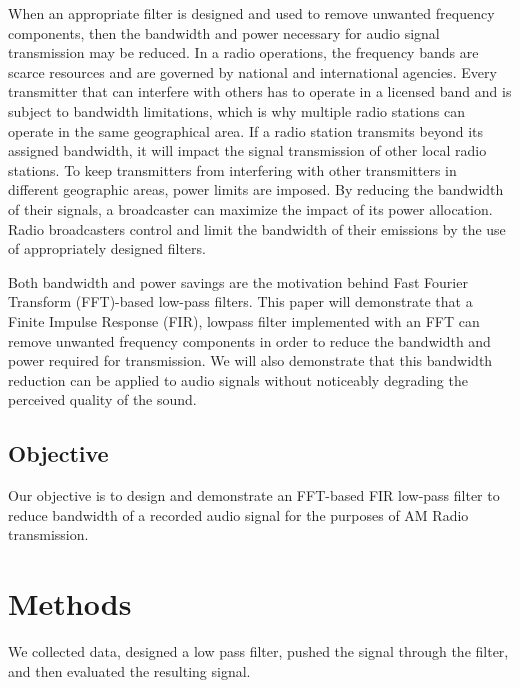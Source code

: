 When an appropriate filter is designed and used to remove
unwanted frequency components, then the bandwidth and power
necessary for audio signal transmission may be reduced. In a
radio operations, the frequency bands are scarce resources and
are governed by national and international agencies. Every
transmitter that can interfere with others has to operate in a
licensed band and is subject to bandwidth limitations, which is
why multiple radio stations can operate in the same geographical
area. If a radio station transmits beyond its assigned bandwidth,
it will impact the signal transmission of other local radio
stations. To keep transmitters from interfering with other
transmitters in different geographic areas, power limits are
imposed. By reducing the bandwidth of their signals, a
broadcaster can maximize the impact of its power allocation.
Radio broadcasters control and limit the bandwidth of their
emissions by the use of appropriately designed  
filters.\cite{notes:class}

Both bandwidth and power savings are the motivation behind Fast
Fourier Transform (FFT)-based low-pass filters. This paper will
demonstrate that a Finite Impulse Response (FIR), lowpass filter
implemented with an FFT can remove unwanted frequency components in
order to reduce the bandwidth and power required for  
transmission.  We will also demonstrate that this bandwidth reduction
can be applied to audio signals without noticeably degrading the 
perceived quality of the sound.

\subsection{Objective}

Our objective is to design and demonstrate an FFT-based FIR
low-pass filter to reduce bandwidth of a recorded audio signal
for the purposes of AM Radio transmission.

\section{Methods}

We collected data, designed a low pass filter, pushed the signal
through the filter, and then evaluated the resulting signal.







